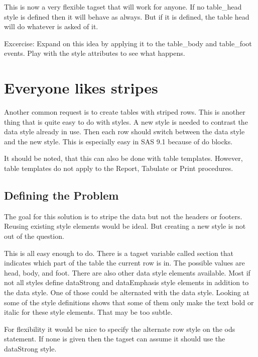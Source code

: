 This is now a very flexible tagset that will work for anyone.
If no table\_head style is defined then it will behave as always.
But if it is defined, the table head will do whatever is asked 
of it.  

Excercise: Expand on this idea by applying it to the table\_body
and table\_foot events.  Play with the style attributes to see what happens.

\section{Everyone likes stripes}
Another common request is to create tables with striped rows.  This is another
thing that is quite easy to do with styles.  A new style is needed to contrast the
data style already in use.  Then each row should switch between the data style and
the new style.  This is especially easy in SAS 9.1 because of do blocks.

It should be noted, that this can also be done with table templates.  However, 
table templates do not apply to the Report, Tabulate or Print procedures.

\subsection{Defining the Problem}
The goal for this solution is to stripe the data but not the headers or footers.
Reusing existing style elements would be ideal. But creating a new style is not 
out of the question.

This is all easy enough to do.  There is a tagset variable called section that
indicates which part of the table the current row is in.  The possible values are head, body,
and foot.  There are also other data style elements available.  Most if not all
styles define dataStrong and dataEmphasis style elements in addition to the data
style.  One of those could be alternated with the data style.  Looking at some of
the style definitions shows that some of them only make the text bold or italic
for these style elements.  That may be too subtle.

For flexibility it would be nice to specify the alternate row style on the ods
statement.  If none is given then the tagset can assume it should use the dataStrong
style.


